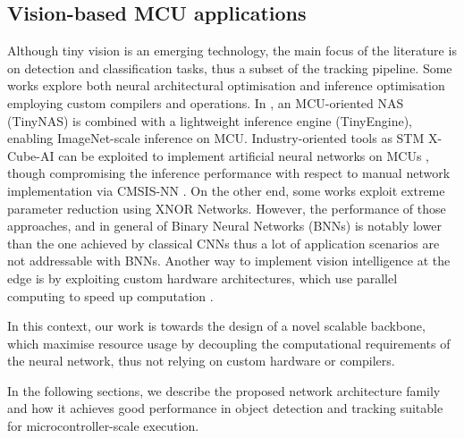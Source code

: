 \subsection{Vision-based MCU applications}
Although tiny vision is an emerging technology, the main focus of the literature is on detection and classification tasks, thus a subset of the tracking pipeline.
Some works explore both neural architectural optimisation and inference optimisation employing custom compilers and operations. In \cite{lin2020mcunet}, an MCU-oriented NAS (TinyNAS) is combined with a lightweight inference engine (TinyEngine), enabling ImageNet-scale inference on MCU.
Industry-oriented tools as STM X-Cube-AI can be exploited to implement artificial neural networks on MCUs \cite{s20092638}, though compromising the inference performance with respect to manual network implementation via CMSIS-NN \cite{lai2018cmsis}.
On the other end, some works \cite{roma} exploit extreme parameter reduction using XNOR Networks. However, the performance of those approaches, and in general of Binary Neural Networks (BNNs) is notably lower than the one achieved by classical CNNs \cite{bulat2019xnor} thus a lot of application scenarios are not addressable with BNNs.
Another way to implement vision intelligence at the edge is by exploiting custom hardware architectures, which use parallel computing to speed up computation \cite{garofalo2020pulp, flamand2018gap}.

In this context, our work is towards the design of a novel scalable backbone, which maximise resource usage by decoupling the computational requirements of the neural network, thus not relying on custom hardware or compilers. %

In the following sections, we describe the proposed network architecture family and how it achieves good performance in object detection and tracking suitable for microcontroller-scale execution.


